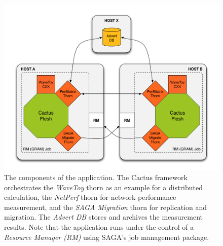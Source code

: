\documentclass[conference,final]{IEEEtran}
\newcommand{\upup}{\vspace*{-1em}}
\begin{document}
\begin{figure}
 \begin{center}
 \includegraphics[scale=0.30]{../diagrams/figure_02}
\end{center}
\caption{The components of the application. The Cactus framework
  orchestrates the \textit{WaveToy} thorn as an example for a
  distributed calculation, the \textit{NetPerf} thorn for network
  performance measurement, and the \textit{SAGA Migration} thorn for
  replication and migration. The \textit{Advert DB} stores and
  archives the measurement results. Note that the application runs
  under the control of a \textit{Resource Manager (RM)} using SAGA's
  job management package.\upup}
 \label{fig:app_arch}
\end{figure}
\end{document}
